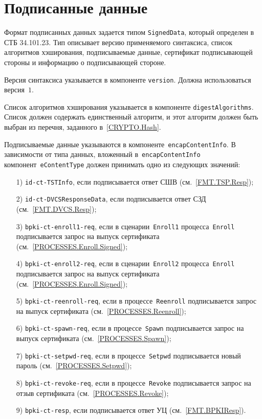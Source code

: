 \section{Подписанные данные}\label{FMT.SignedData}

Формат подписанных данных задается типом \texttt{SignedData}, 
который определен в СТБ 34.101.23. Тип описывает версию применяемого 
синтаксиса, список алгоритмов хэширования, подписываемые данные, 
сертификат подписывающей стороны и информацию о подписывающей стороне. 

Версия синтаксиса указывается в компоненте \texttt{version}.
Должна использоваться версия~$1$.

Список алгоритмов хэширования указывается в компоненте
\texttt{digestAlgorithms}. Список должен содержать единственный алгоритм,
и этот алгоритм должен быть выбран из перечня, 
заданного в~\ref{CRYPTO.Hash}.

Подписываемые данные указываются в компоненте~\texttt{encapContentInfo}. 
%
В зависимости от типа данных, вложенный в~\texttt{encapContentInfo} 
компонент~\texttt{eContentType} должен принимать одно из следующих значений:
\begin{enumerate}
\item[1)]
\texttt{id-ct-TSTInfo}, если подписывается ответ СШВ (см.~\ref{FMT.TSP.Resp});
\item[2)]
\texttt{id-ct-DVCSResponseData}, если подписывается ответ СЗД 
(см.~\ref{FMT.DVCS.Resp});
\item[3)]
\texttt{bpki-ct-enroll1-req}, если в сценарии~\texttt{Enroll1} 
процесса~\texttt{Enroll} подписывается запрос на выпуск сертификата 
(см.~\ref{PROCESSES.Enroll.Signed}); 
\item[4)]
\texttt{bpki-ct-enroll2-req}, если в сценарии~\texttt{Enroll2} 
процесса~\texttt{Enroll} подписывается запрос на выпуск сертификата 
(см.~\ref{PROCESSES.Enroll.Signed}); 
\item[5)]
\texttt{bpki-ct-reenroll-req}, если в процессе~\texttt{Reenroll} 
подписывается запрос на выпуск сертификата 
(см.~\ref{PROCESSES.Reenroll}); 
\item[6)]
\texttt{bpki-ct-spawn-req}, если в процессе~\texttt{Spawn} 
подписывается запрос на выпуск сертификата 
(см.~\ref{PROCESSES.Spawn}); 
\item[7)]
\texttt{bpki-ct-setpwd-req}, если в процессе~\texttt{Setpwd} 
подписывается новый пароль (см.~\ref{PROCESSES.Setpwd}); 
\item[8)]
\texttt{bpki-ct-revoke-req}, если в процессе~\texttt{Revoke} 
подписывается запрос на отзыв сертификата (см.~\ref{PROCESSES.Revoke}); 
\item[9)]
\texttt{bpki-ct-resp}, если подписывается ответ УЦ 
(см.~\ref{FMT.BPKIResp}).
\end{enumerate}


